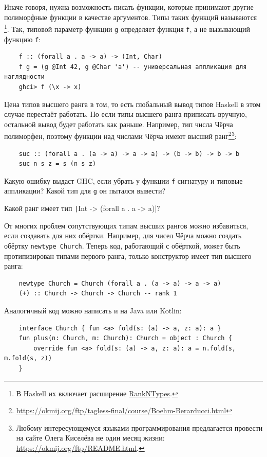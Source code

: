 Иначе говоря, нужна возможность писать функции, которые принимают другие полиморфные функции в качестве аргументов.
Типы таких функций называются \footnote{В Haskell их включает расширение \href{https://downloads.haskell.org/ghc/latest/docs/users_guide/exts/rank_polymorphism.html}{RankNTypes}.}.
Так, типовой параметр функции \texttt{g} определяет функция \texttt{f}, а не вызывающий функцию \texttt{f}:
\begin{verbatim}
    f :: (forall a . a -> a) -> (Int, Char)
    f g = (g @Int 42, g @Char 'a') -- универсальная аппликация для наглядности
    ghci> f (\x -> x)
\end{verbatim}

Цена типов высшего ранга в том, то есть глобальный вывод типов Haskell в этом случае перестаёт работать.
Но если типы высшего ранга приписать вручную, остальной вывод будет работать как раньше.
Например, тип числа Чёрча полиморфен, поэтому функции над числами Чёрча имеют высший ранг\footnote{\url{https://okmij.org/ftp/tagless-final/course/Boehm-Berarducci.html}}\footnote{Любому интересующемуся языками программирования предлагается провести на сайте Олега Киселёва не один месяц жизни: \url{https://okmij.org/ftp/README.html}.}:
\begin{verbatim}
    suc :: (forall a . (a -> a) -> a -> a) -> (b -> b) -> b -> b
    suc n s z = s (n s z)
\end{verbatim}

\begin{task}
    Какую ошибку выдаст GHC, если убрать у функции \texttt{f} сигнатуру и типовые аппликации?
    Какой тип для \texttt{g} он пытался вывести?
\end{task}

\begin{task}
    Какой ранг имеет тип \texttt|Int -> (forall a . a -> a)|?
\end{task}

От многих проблем сопутствующих типам высших рангов можно избавиться, если создавать для них обёртки.
Например, для чисел Чёрча можно создать обёртку \texttt{newtype Church}.
Теперь код, работающий с обёрткой, может быть протипизирован типами первого ранга, только конструктор имеет тип высшего ранга:
\begin{verbatim}
    newtype Church = Church (forall a . (a -> a) -> a -> a)
    (+) :: Church -> Church -> Church -- rank 1
\end{verbatim}
Аналогичный код можно написать и на Java или Kotlin:
\begin{verbatim}
    interface Church { fun <a> fold(s: (a) -> a, z: a): a }
    fun plus(n: Church, m: Church): Church = object : Church {
        override fun <a> fold(s: (a) -> a, z: a): a = n.fold(s, m.fold(s, z))
    }
\end{verbatim}

